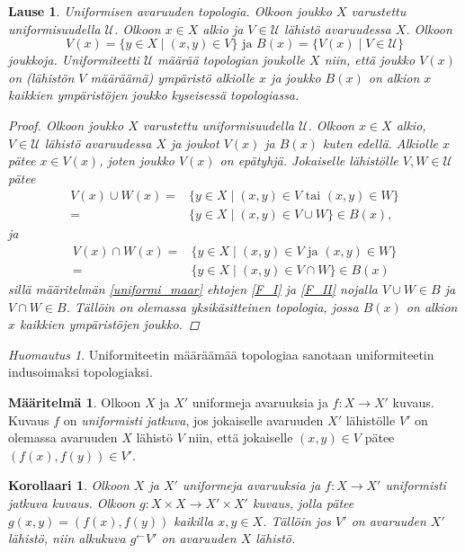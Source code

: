 \documentclass[12pt,a4paper,leqno]{report}
\newcommand{\U}{\mathcal{U}}
\theoremstyle{plain}
\newtheorem{lause}[equation]{Lause}
\newtheorem{kor}[equation]{Korollaari}
\theoremstyle{definition}
\newtheorem{maar}[equation]{Määritelmä}
\theoremstyle{remark}
\newtheorem{huom}[equation]{Huomautus}
\begin{document}
\begin{lause}
Uniformisen avaruuden topologia.
Olkoon joukko $X$ varustettu uniformisuudella $\U$.
Olkoon $x\in X$ alkio ja $V\in\U$ lähistö avaruudessa $X$. Olkoon %
\begin{equation*}V(x)=\{ y\in X\mid (x,y)\in V \}
\text{ ja }
B(x)=\{ V(x)\mid V\in\U \}
\end{equation*}
joukkoja.
Uniformiteetti $\U$ määrää topologian joukolle $X$ niin, että joukko $V(x)$ on (lähistön $V$ määräämä) ympäristö alkiolle $x$ ja joukko $B(x)$ on alkion $x$ kaikkien ympäristöjen joukko kyseisessä topologiassa.
\begin{proof}
Olkoon joukko $X$ varustettu uniformisuudella $\U$.
Olkoon $x\in X$ alkio, $V\in\U$ lähistö avaruudessa $X$ ja joukot $V(x)$ ja $B(x)$ kuten edellä. 
%
Alkiolle $x$ pätee $x\in V(x)$, joten joukko $V(x)$ on epätyhjä. 
Jokaiselle lähistölle $V,W\in\U$ pätee 
\begin{align*}
V(x)\cup W(x) =&\{ y\in X\mid (x,y)\in V \text{ tai } (x,y)\in W \}\\
=&\{ y\in X\mid (x,y)\in V\cup W \}
\in B(x),
\end{align*} 
ja 
\begin{align*}
V(x)\cap W(x) =&\{ y\in X\mid (x,y)\in V \text{ ja } (x,y)\in W \}\\
=&\{ y\in X\mid (x,y)\in V\cap W \}
\in B(x)
\end{align*} 
sillä määritelmän \ref{uniformi_maar} ehtojen \ref{F_I} ja \ref{F_II} nojalla $ V\cup W \in B$ ja $ V\cap W \in B$. Tällöin on olemassa yksikäsitteinen topologia, jossa $B(x)$ on alkion $x$ kaikkien ympäristöjen joukko.\cite{Eom1}
\end{proof}
\end{lause}
\begin{huom}
Uniformiteetin määräämää topologiaa sanotaan uniformiteetin indusoimaksi topologiaksi.
\end{huom}
\begin{maar}
Olkoon $X$ ja $X'$ uniformeja avaruuksia 
ja $f\colon X\rightarrow X'$ kuvaus.
Kuvaus $f$ on \emph{uniformisti jatkuva}, jos jokaiselle avaruuden $X'$ lähistölle $V'$ on olemassa avaruuden $X$ lähistö $V$ niin, että jokaiselle $(x,y)\in V$ pätee $(f(x),f(y))\in V'$. 
\end{maar}
\begin{kor}\label{uniformi alkukuva}
Olkoon $X$ ja $X'$ uniformeja avaruuksia 
ja $f\colon X\rightarrow X'$ uniformisti jatkuva kuvaus. 
Olkoon $g\colon X\times X\rightarrow X'\times X'$ %
kuvaus, jolla pätee $g(x,y)=(f(x),f(y))$ kaikilla $x,y\in X$. 
Tällöin jos $V'$ on avaruuden $X'$ lähistö, niin alkukuva $g^{\leftarrow}V'$ on avaruuden $X$ lähistö.
\end{kor}
\end{document}

